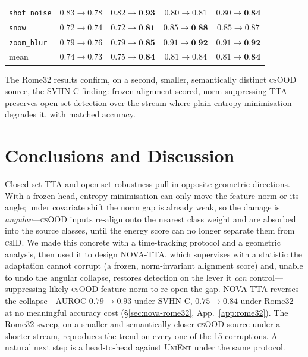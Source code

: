 \documentclass[11pt]{article}
\newcommand{\csid}{\textsc{cs}ID}
\newcommand{\csood}{\textsc{cs}OOD}
\newcommand{\method}[1]{\textsc{#1}}
\begin{document}
\begin{table}[t]
\begin{tabular}{lcccc}
    \texttt{shot\_noise}        & $0.83\to0.78$ & $0.82\to\textbf{0.93}$ & $0.80\to0.81$ & $0.80\to\textbf{0.84}$\\
    \texttt{snow}               & $0.72\to0.74$ & $0.72\to\textbf{0.81}$ & $0.85\to\textbf{0.88}$ & $0.85\to0.87$\\
    \texttt{zoom\_blur}         & $0.79\to0.76$ & $0.79\to\textbf{0.85}$ & $0.91\to\textbf{0.92}$ & $0.91\to\textbf{0.92}$\\
    \midrule
    mean                        & $0.74\to0.73$ & $0.75\to\textbf{0.84}$ & $0.81\to0.84$ & $0.81\to\textbf{0.84}$\\
    \bottomrule
  \end{tabular}
\end{table}

\noindent The Rome32 results confirm, on a second, smaller, semantically
distinct \csood{} source, the SVHN-C finding: frozen alignment-scored,
norm-suppressing TTA preserves open-set detection over the stream where
plain entropy minimisation degrades it, with matched accuracy.

\section{Conclusions and Discussion}

Closed-set TTA and open-set robustness pull in opposite geometric
directions. With a frozen head, entropy minimisation can only move the
feature norm or its angle; under covariate shift the norm gap is already
weak, so the damage is \emph{angular}---\csood{} inputs re-align onto the
nearest class weight and are absorbed into the source classes, until the
energy score can no longer separate them from \csid. We made this concrete
with a time-tracking protocol and a geometric analysis, then used it to
design \method{NOVA-TTA}, which supervises with a statistic the adaptation
cannot corrupt (a frozen, norm-invariant alignment score) and, unable to
undo the angular collapse, restores detection on the lever it \emph{can}
control---suppressing likely-\csood{} feature norm to re-open the gap.
\method{NOVA-TTA} reverses the collapse---AUROC $0.79\!\to\!0.93$ under
SVHN-C, $0.75\!\to\!0.84$ under Rome32---at no meaningful accuracy cost
(\S\ref{sec:nova-rome32}, App.~\ref{app:rome32}). The Rome32 sweep, on a
smaller and semantically closer \csood{} source under a shorter stream,
reproduces the trend on every one of the 15 corruptions. A natural next
step is a head-to-head against \method{UniEnt} under the same protocol.
\end{document}
